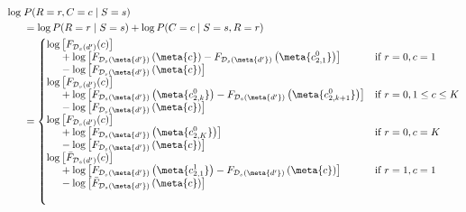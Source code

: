 \begin{align*}
    \log\; &P(R=r, C=c \;\vert\; S=s) \\
    &= \log P(R=r \;\vert\; S=s) + \log P(C=c \;\vert\; S=s, R=r) \\
    &= \begin{cases}
        \begin{aligned}
            \log&\left[F_{\mathcal{D}_{s}(d')}(c)\right] \\
            &+ \log\left[F_{\mathcal{D}_s(\meta{d'})}\left(\meta{c}\right) - F_{\mathcal{D}_s(\meta{d'})}\left(\meta{c_{2,1}^0}\right)\right] \\
            &- \log\left[F_{\mathcal{D}_s(\meta{d'})}\left(\meta{c}\right)\right]    
        \end{aligned} & \textrm{if } r=0, c=1 \\
        \begin{aligned}
            \log&\left[F_{\mathcal{D}_{s}(d')}(c)\right] \\
            &+ \log\left[F_{\mathcal{D}_s(\meta{d'})}\left(\meta{c_{2,k}^0}\right) -
            F_{\mathcal{D}_s(\meta{d'})}\left(\meta{c_{2,k+1}^0}\right)\right] \\
            &-  \log\left[F_{\mathcal{D}_s(\meta{d'})}\left(\meta{c}\right)\right]
        \end{aligned} & \textrm{if } r=0, 1 \le c \le K \\
        \begin{aligned}
            \log&\left[F_{\mathcal{D}_{s}(d')}(c)\right] \\
            &+ \log\left[F_{\mathcal{D}_s(\meta{d'})}\left(\meta{c_{2,K}^0}\right)\right] \\
            &- \log\left[F_{\mathcal{D}_s(\meta{d'})}\left(\meta{c}\right)\right]
        \end{aligned} & \textrm{if } r=0, c = K \\
        \begin{aligned}
            \log&\left[\bar{F}_{\mathcal{D}_{s}(d')}(c)\right] \\
            &+ \log\left[F_{\mathcal{D}_s(\meta{d'})}\left(\meta{c_{2,1}^1}\right) -
            F_{\mathcal{D}_s(\meta{d'})}\left(\meta{c}\right)\right] \\
            &- \log\left[\bar{F}_{\mathcal{D}_s(\meta{d'})}\left(\meta{c}\right)\right]
        \end{aligned} & \textrm{if } r=1, c=1 \\
        \begin{aligned}

\end{aligned}
\end{cases}
\end{align*}
